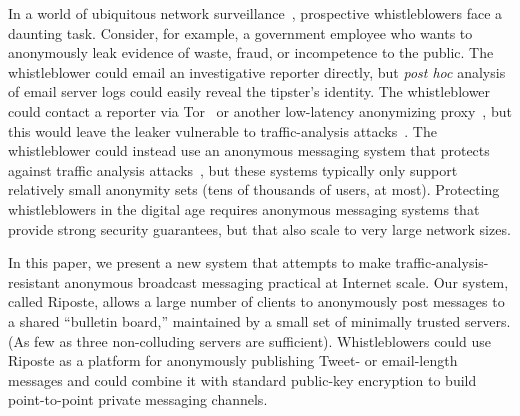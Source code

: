 \documentclass[10pt,twocolumn]{article}
\newcommand{\name}{Riposte\xspace}
\begin{document}
In a world of ubiquitous network 
surveillance~\cite{bennhold2014britain,gellman2013nsa,
gellman2014nsa,goel2014government,nakashima2014court}, 
prospective whistleblowers face a daunting task.
Consider, for example, a government employee who wants to anonymously 
leak evidence of waste, fraud, or incompetence to the public.
The whistleblower could email an investigative reporter directly, but {\em post hoc} 
analysis of email server logs could easily reveal the tipster's identity.
The whistleblower could contact a reporter via 
Tor~\cite{dingledine2004tor} or another
low-latency anonymizing proxy~\cite{freedman2002tarzan,leblond2013towards,mittal2009shadowwalker,reiter1998crowds}, 
but this would leave the leaker vulnerable to traffic-analysis attacks~\cite{bauer2007low,murdoch2005low,murdoch2007sampled}.
The whistleblower could instead use an anonymous messaging system that protects
against traffic analysis attacks~\cite{chaum1988dining,goel2003herbivore,wolinsky2012dissent}, 
but these systems typically only support
relatively small anonymity sets (tens of thousands of users, at most).
Protecting whistleblowers in the digital age requires 
anonymous messaging systems that provide strong security guarantees,
but that also scale to very large network sizes.

In this paper, we present a new system that attempts to make
traffic-analysis-resistant anonymous broadcast 
messaging practical at Internet scale.
Our system, called \name, allows a large number of clients 
to anonymously post messages to a
shared ``bulletin board,'' maintained by a small set of 
minimally trusted servers. 
(As few as three non-colluding servers are sufficient).
Whistleblowers could use \name as a platform for anonymously publishing Tweet-
or email-length messages and could combine it with standard
public-key encryption to build point-to-point private messaging channels.
\end{document}
